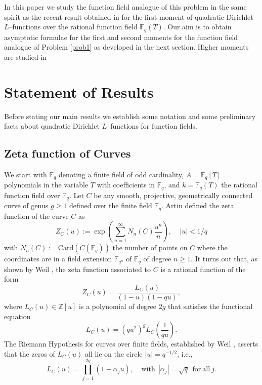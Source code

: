 \documentclass[11pt]{amsart}
\begin{document}
In this paper we study the function field analogue of this problem in the same spirit as the recent result obtained in \cite{AK} for the first moment of quadratic Dirichlet $L$--functions over the rational function field $\mathbb{F}_{q}(T)$. Our aim is to obtain asymptotic formulae for the first and second moments for the function field analogue of Problem \ref{prob1} as developed in the next section. Higher moments are studied in \cite{And1} 

\section{Statement of Results}
Before stating our main results we establish some notation and some preliminary facts about quadratic Dirichlet $L$--functions for function fields.

\subsection{Zeta function of Curves}

We start with $\mathbb{F}_{q}$ denoting a finite field of odd cardinality, $A=\mathbb{F}_{q}[T]$ polynomials in the variable $T$ with coefficients in $\mathbb{F}_{q}$, and $k=\mathbb{F}_{q}(T)$ the rational function field over $\mathbb{F}_{q}$. Let $C$ be any smooth, projective, geometrically connected curve of genus $g\geq1$ defined over the finite field $\mathbb{F}_{q}$. Artin \cite{A} defined the zeta function of the curve $C$ as
\begin{equation}
Z_{C}(u):=\exp\left(\sum_{n=1}^{\infty}N_{n}(C)\frac{u^{n}}{n}\right), \ \ \ \ \ |u|<1/q
\end{equation}
with $N_{n}(C):=\mathrm{Card}(C(\mathbb{F}_{q}))$ the number of points on $C$ where the coordinates are in a field extension $\mathbb{F}_{q^{n}}$ of $\mathbb{F}_{q}$ of degree $n\geq1$. It turns out that, as shown by Weil \cite{W}, the zeta function associated to $C$ is a rational function of the form
\begin{equation}\label{eq:zetaC}
Z_{C}(u)=\frac{L_{C}(u)}{(1-u)(1-qu)},
\end{equation}
where $L_{C}(u)\in\mathbb{Z}[u]$ is a polynomial of degree $2g$ that satisfies the functional equation
\begin{equation}\label{eq:funceq}
L_{C}(u)=(qu^{2})^{g}L_{C}\left(\frac{1}{qu}\right).
\end{equation}
The Riemann Hypothesis for curves over finite fields, established by Weil \cite{W}, asserts that the zeros of $L_{C}(u)$ all lie on the circle $|u|=q^{-1/2}$, i.e.,
\begin{equation}
L_{C}(u)=\prod_{j=1}^{2g}(1-\alpha_{j}u), \ \ \ \ \ \mathrm{with} \ \ |\alpha_{j}|=\sqrt{q} \ \ \mathrm{for \ all}\ j.
\end{equation}
\end{document}
